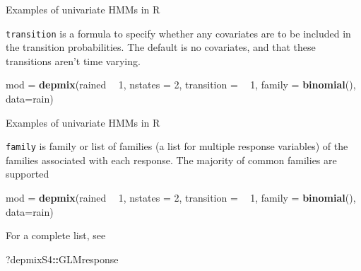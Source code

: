 \documentclass[
  ignorenonframetext,
]{beamer}
\newenvironment{Shaded}{\begin{snugshade}}{\end{snugshade}}
\newcommand{\DataTypeTok}[1]{\textcolor[rgb]{0.13,0.29,0.53}{#1}}
\newcommand{\DecValTok}[1]{\textcolor[rgb]{0.00,0.00,0.81}{#1}}
\newcommand{\KeywordTok}[1]{\textcolor[rgb]{0.13,0.29,0.53}{\textbf{#1}}}
\newcommand{\NormalTok}[1]{#1}
\newcommand{\OperatorTok}[1]{\textcolor[rgb]{0.81,0.36,0.00}{\textbf{#1}}}
\newcommand{\StringTok}[1]{\textcolor[rgb]{0.31,0.60,0.02}{#1}}
\begin{document}
\begin{frame}[fragile]{Examples of univariate HMMs in R}
\protect\hypertarget{examples-of-univariate-hmms-in-r-9}{}

\texttt{transition} is a formula to specify whether any covariates are
to be included in the transition probabilities. The default is no
covariates, and that these transitions aren't time varying.

\begin{Shaded}
\begin{Highlighting}[]
\NormalTok{mod =}\StringTok{ }\KeywordTok{depmix}\NormalTok{(rained }\OperatorTok{~}\StringTok{ }\DecValTok{1}\NormalTok{, }
             \DataTypeTok{nstates =} \DecValTok{2}\NormalTok{, }
             \DataTypeTok{transition =} \OperatorTok{~}\StringTok{ }\DecValTok{1}\NormalTok{,}
             \DataTypeTok{family =} \KeywordTok{binomial}\NormalTok{(),}
             \DataTypeTok{data=}\NormalTok{rain)}
\end{Highlighting}
\end{Shaded}

\end{frame}

\begin{frame}[fragile]{Examples of univariate HMMs in R}
\protect\hypertarget{examples-of-univariate-hmms-in-r-10}{}

\texttt{family} is family or list of families (a list for multiple
response variables) of the families associated with each response. The
majority of common families are supported

\begin{Shaded}
\begin{Highlighting}[]
\NormalTok{mod =}\StringTok{ }\KeywordTok{depmix}\NormalTok{(rained }\OperatorTok{~}\StringTok{ }\DecValTok{1}\NormalTok{, }
             \DataTypeTok{nstates =} \DecValTok{2}\NormalTok{, }
             \DataTypeTok{transition =} \OperatorTok{~}\StringTok{ }\DecValTok{1}\NormalTok{,}
             \DataTypeTok{family =} \KeywordTok{binomial}\NormalTok{(), }
             \DataTypeTok{data=}\NormalTok{rain)}
\end{Highlighting}
\end{Shaded}

For a complete list, see

\begin{Shaded}
\begin{Highlighting}[]
\NormalTok{?depmixS4}\OperatorTok{::}\NormalTok{GLMresponse}
\end{Highlighting}
\end{Shaded}

\end{frame}
\end{document}
